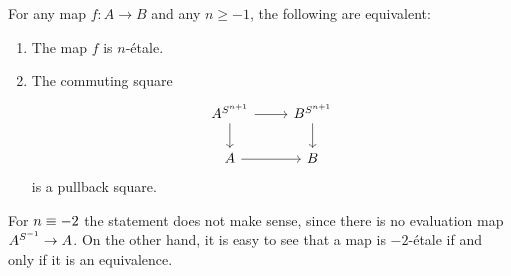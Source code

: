 \documentclass[9pt,twosided]{amsart}
\begin{document}
\begin{thm}
  For any map $f:A\to B$ and any $n\geq -1$, the following are equivalent:
  \begin{enumerate}
  \item The map $f$ is $n$-\'etale.
  \item The commuting square
    \begin{equation*}
      \begin{tikzcd}
        A^{\sphere{n+1}} \arrow[r] \arrow[d] & B^{\sphere{n+1}} \arrow[d] \\
        A \arrow[r] & B
      \end{tikzcd}
    \end{equation*}
    is a pullback square.
  \end{enumerate}
\end{thm}

\begin{rmk}
  For $n\equiv -2$ the statement does not make sense, since there is no evaluation map
  $A^{S^{-1}}\to A$. On the other hand, it is easy to see that a map is $-2$-\'etale if and only if it is an equivalence.
\end{rmk}
\end{document}
